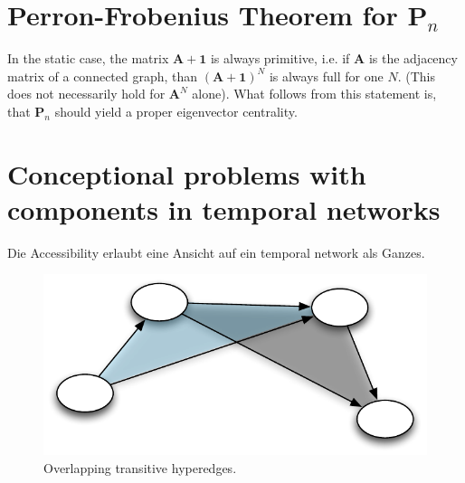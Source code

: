 \section{Perron-Frobenius Theorem for $\mathbf{P}_n$}
In the static case, the matrix $\mathbf{A}+\mathbf{1}$ is always primitive, i.e. if $\mathbf{A}$ is the adjacency matrix of a connected graph, than $(\mathbf{A}+\mathbf{1})^N$ is always full for one $N$.
(This does not necessarily hold for $\mathbf{A}^N$ alone).
What follows from this statement is, that $\mathbf{P}_n$ should yield a proper eigenvector centrality.

\section{Conceptional problems with components in temporal networks}
Die Accessibility erlaubt eine Ansicht auf ein temporal network als Ganzes.


\begin{figure}[htbp]
\begin{center}
\includegraphics{images/transitivity_scheme}
\caption{Overlapping transitive hyperedges.}
\label{fig:overlapping_hyperedges}
\end{center}
\end{figure}

